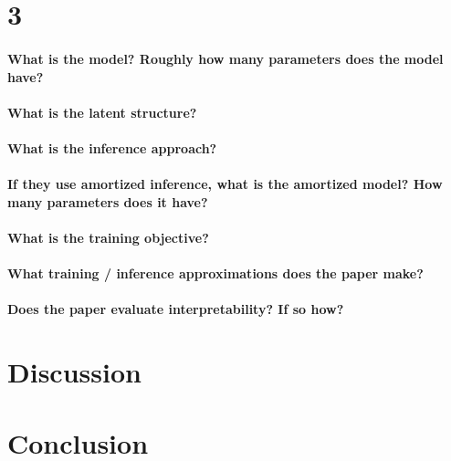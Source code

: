 \documentclass[11pt]{article}
\begin{document}
\section{3}

\paragraph{What is the model? Roughly how many parameters does the model have?}

\paragraph{What is the latent structure?}

\paragraph{What is the inference approach?}

\paragraph{If they use amortized inference, what is the amortized model? How many parameters does it have?}

\paragraph{What is the training objective?}

\paragraph{What training / inference approximations does the paper make?}

\paragraph{Does the paper evaluate interpretability? If so how?}

\section{Discussion}

\section{Conclusion}



\end{document}
